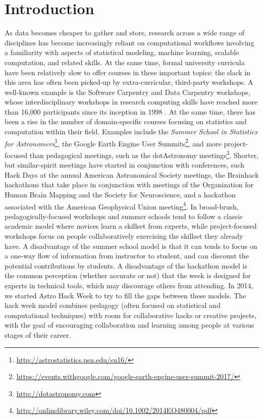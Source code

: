 \section*{Introduction}
\label{sec:introduction}

As data becomes cheaper to gather and store, research across a wide range of disciplines has become increasingly reliant on computational workflows involving a familiarity with aspects of statistical modeling, machine learning, scalable computation, and related skills.
At the same time, formal university curricula have been relatively slow to offer courses in these important topics: the slack in this area has often been picked-up by extra-curricular, third-party workshops.
A well-known example is the Software Carpentry and Data Carpentry workshops, whose interdisciplinary workshops in research computing skills have reached more than 16,000 participants since its inception in 1998 \cite{b:wilson-swc-lessons-2016,teal2015data}.
At the same time, there has been a rise in the number of domain-specific courses focusing on statistics and computation within their field.
Examples include the \textit{Summer School in Statistics for Astronomers}\footnote{\url{http://astrostatistics.psu.edu/su16/}}, the Google Earth Engine User Summits\footnote{\url{https://events.withgoogle.com/google-earth-engine-user-summit-2017/}}, and more project-focused than pedagogical meetings, such as the dotAstronomy meetings\footnote{\url{http://dotastronomy.com}}.
Shorter, but similar-spirit meetings have started in conjunction with conferences, such Hack Days at the annual American Astronomical Society meetings, the Brainhack hackathons that take place in conjunction with meetings of the Organization for Human Brain Mapping and the Society for Neuroscience\cite{Cameron_Craddock2016-wc}, and a hackathon associated with the American Geophysical Union meeting\footnote{\url{http://onlinelibrary.wiley.com/doi/10.1002/2014EO480004/pdf}}.
In broad-brush, pedagogically-focused workshops and summer schools tend to follow a classic academic model where novices learn a skillset from experts, while project-focused workshops focus on people collaboratively exercising the skillset they already have.
A disadvantage of the summer school model is that it can tends to focus on a one-way flow of information from instructor to student, and can discount the potential contributions by students.
A disadvantage of the hackathon model is the common perception (whether accurate or not) that the week is designed for experts in technical tools, which may discourage others from attending.
In 2014, we started Astro Hack Week to try to fill the gaps between these models.
The hack week model combines pedagogy (often focused on statistical and computational techniques) with room for collaborative hacks or creative projects, with the goal of encouraging collaboration and learning among people at various stages of their career.

